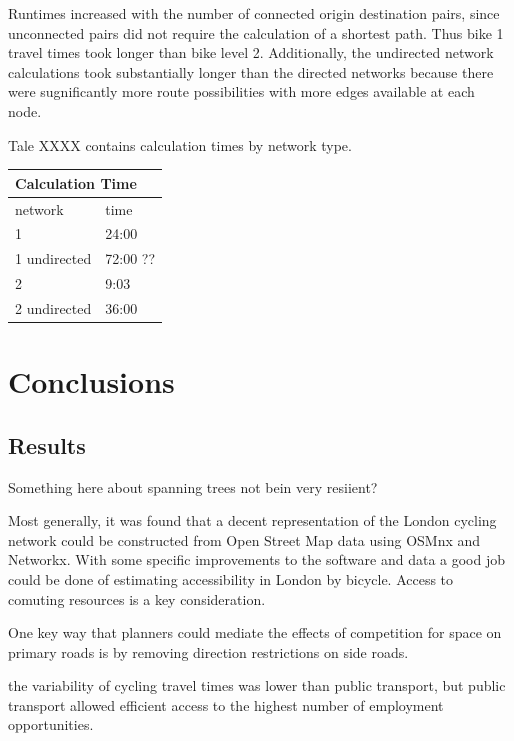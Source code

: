 \documentclass[11pt]{article} %
\begin{document}
Runtimes increased with the number of connected origin destination pairs, since unconnected pairs  did not require the calculation of a shortest path. Thus bike 1 travel times took longer than bike level 2. Additionally, the undirected network calculations took substantially longer than the directed networks because there were sugnificantly more route possibilities with more edges available at each node. 

Tale XXXX contains calculation times by network type. 

\begin{table}[]
\begin{tabular}{ll}
\multicolumn{2}{l}{Calculation Time} \\ \hline
network             & time           \\
1                   & 24:00          \\
1 undirected        & 72:00 ??       \\
2                   & 9:03           \\
2 undirected        & 36:00         
\end{tabular}
\end{table}



\section{Conclusions}

\subsection{Results}

Something here about spanning trees not bein very resiient? 

Most generally, it was found that a decent representation of the London cycling network could be constructed from Open Street Map data using OSMnx and Networkx. With some specific improvements to the software and data a good job could be done of estimating accessibility in London by bicycle. Access to comuting resources is a key consideration. 

One key way that planners could mediate the effects of competition for space on primary roads is by removing direction restrictions on side roads. 

the variability of cycling travel times was lower than public transport, but public transport allowed efficient access to the highest number of employment opportunities. 
\end{document}
